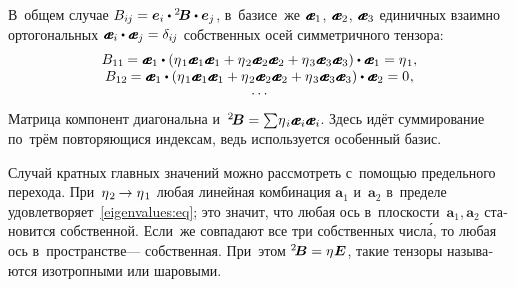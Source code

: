 \begin{otherlanguage}{russian}
\vspace{-0.25em} В~общем случае ${B_{i\hspace{-0.1ex}j} = \bm{e}_i \dotp {^2\!\bm{B}} \dotp \bm{e}_j}$, в~базисе~же ${\mathboldae_1}$, ${\mathboldae_2}$, ${\mathboldae_3}$ единичных взаимно ортогональных ${\mathboldae_i \dotp \mathboldae_j = \delta_{i\hspace{-0.1ex}j}}$ собственных осей симметричного тензора:
\[\begin{array}{c}
B_{11} \hspace{-0.12ex} = \mathboldae_1 \dotp \left({\eigenvalue_1 \mathboldae_1 \mathboldae_1 + \eigenvalue_2 \mathboldae_2 \mathboldae_2 + \eigenvalue_3 \mathboldae_3 \mathboldae_3}\right) \dotp \mathboldae_1 = \eigenvalue_1, \\
B_{12} \hspace{-0.12ex} = \mathboldae_1 \dotp \left({\eigenvalue_1 \mathboldae_1 \mathboldae_1 + \eigenvalue_2 \mathboldae_2 \mathboldae_2 + \eigenvalue_3 \mathboldae_3 \mathboldae_3}\right) \dotp \mathboldae_2 = 0 \hspace{0.1ex}, \\[-0.2em]
\ldots
\end{array}\]
\noindent Матрица компонент диагональна и~${{^2\!\bm{B}} = \sum\! \eigenvalue_i \mathboldae_i \mathboldae_i}$. Здесь идёт суммирование по~трём повторяющися индексам, %
ведь используется особенный базис.

Случай кратных главных значений можно рассмотреть с~помощью предельного перехода. При~${\eigenvalue_2 \hspace{-0.16ex} \to \eigenvalue_1}$ любая линейная комбинация ${\bm{a}_1}$ и~${\bm{a}_2}$ в~пределе удовлетворяет~\eqref{eigenvalues:eq}; это значит, что любая ось в~плоскости~${\bm{a}_1, \bm{a}_2}$ становится собственной. Если~же совпадают все три собственных числ\'{а}, то любая ось в~пространстве\:--- собственная. При~этом ${{^2\!\bm{B}} = \eigenvalue \bm{E}}$, такие тензоры называются изотропными или шаровыми.

\end{otherlanguage}



